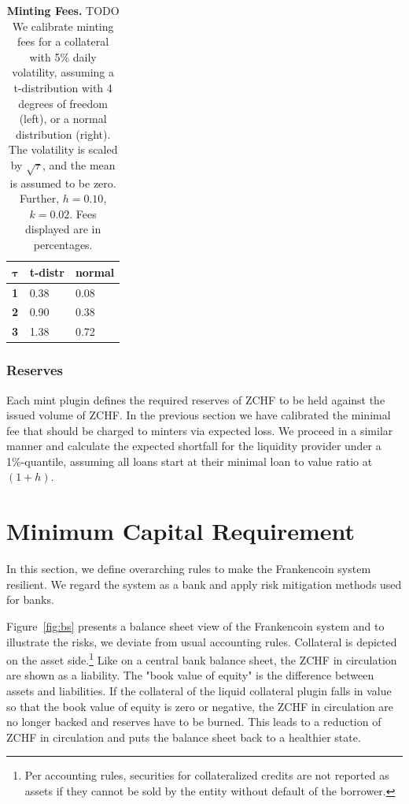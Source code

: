 \documentclass[english,11pt]{article}
\begin{document}
\begin{table}[]
\caption{\textbf{Minting Fees.}
    TODO We calibrate minting fees for a collateral with 5\% daily volatility,
    assuming a t-distribution with 4 degrees of freedom (left), or a normal
    distribution (right). The volatility is scaled by $\sqrt{\tau}$, and the
    mean is assumed to be zero. Further, $h=0.10$, $k=0.02$. Fees displayed are in percentages.} %
	\begin{center}
	\begin{tabular}{lll}
	\hline
	\textbf{$\mathbf{\tau}$} & \textbf{t-distr} & \textbf{normal} \\
	\hline
	\textbf{1}                   & 0.38             & 0.08            \\
	\textbf{2}                   & 0.90             & 0.38            \\
	\textbf{3}                   & 1.38             & 0.72   \\        
	\hline
	\end{tabular}
	\label{tab:calibration}
	\end{center}
\end{table}

\subsubsection{Reserves}
Each mint plugin defines the required reserves of ZCHF to be held against
the issued volume of ZCHF. In the previous section we have calibrated
the minimal fee that should be charged to minters via expected loss.
We proceed in a similar manner and calculate the expected shortfall
for the liquidity provider under a 1\%-quantile, assuming all
loans start at their minimal loan to value ratio at $(1+h)$.


\section{Minimum Capital Requirement}
In this section, we define overarching rules to make the Frankencoin system
resilient. We regard the system as a bank and apply risk mitigation methods
used for banks.

Figure~\ref{fig:bs} presents a balance sheet view of the Frankencoin system
and to illustrate the risks, we deviate from usual accounting rules.
Collateral is depicted on the asset side.\footnote{Per accounting rules, 
securities for collateralized credits are not reported as assets
if they cannot be sold by the entity without default of the borrower.}
Like on a central bank balance sheet, the ZCHF in circulation are shown
as a liability. The "book value of equity" is the difference between assets
and liabilities. If the collateral of the liquid collateral plugin falls in value so that
the book value of equity is zero or negative, the ZCHF in circulation
are no longer backed and reserves have to be burned. This leads
to a reduction of ZCHF in circulation and puts the balance sheet back to
a healthier state.
\end{document}
